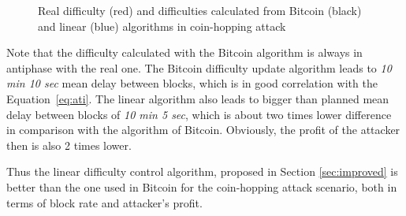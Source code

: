 \documentclass[]{llncs}
\newcommand{\attackname}{coin-hopping attack}
\begin{document}
\begin{figure}[h]
\caption{Real difficulty (red) and difficulties calculated from Bitcoin (black) and linear (blue) algorithms in \attackname{}}
\label{fig:attack}
\end{figure}

Note that the difficulty calculated with the Bitcoin algorithm is always in antiphase with the real one.
The Bitcoin difficulty update algorithm leads to {\em 10 min 10 sec} mean delay between blocks, which is in good correlation with the Equation~\ref{eq:ati}.
The linear algorithm also leads to bigger than planned mean delay between blocks of {\em 10 min 5 sec}, which is about two times lower difference in comparison with the algorithm of Bitcoin. Obviously, the profit of the attacker then is also 2 times lower.

Thus the linear difficulty control algorithm, proposed in Section \ref{sec:improved} is better than the one used in Bitcoin for the \attackname{} scenario, both in terms of block rate and attacker's profit.



\end{document}
